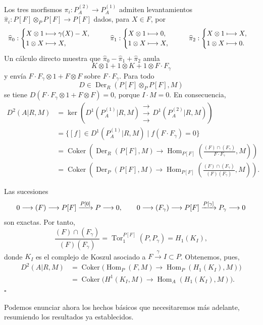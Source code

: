Los tres morfismos
$\pi_i:P_A^{(2)}\longrightarrow P_A^{(1)}$ admiten levantamientos
$\widehat\pi_i:P[F]\otimes_PP[F]\longrightarrow P[F]$ dados, para
$X\in F$, por
\[
\begin{array}{c@{\qquad}c@{\qquad}c}
\widehat\pi_0:
\begin{cases}
 X\otimes1\longmapsto\gamma(X)-X,\\
 1\otimes X\longmapsto X,
\end{cases}
&
\widehat\pi_1:
\begin{cases}
 X\otimes1\longmapsto0,\\
 1\otimes X\longmapsto X,
\end{cases}
&
\widehat\pi_2:
\begin{cases}
 X\otimes1\longmapsto X,\\
 1\otimes X\longmapsto0.
\end{cases}
\end{array}
\]
Un cálculo directo muestra que
$\widehat\pi_0-\widehat\pi_1+\widehat\pi_2$ anula
\[
 K\otimes1+1\otimes K+1\otimes F\cdot F_\gamma
\]
y envía
$F\cdot F_\gamma\otimes1+F\otimes F$ sobre
$F\cdot F_\gamma$. Para todo
\[
 D\in\operatorname{Der}_R(P[F]\otimes_PP[F],M)
\]
se tiene
$D(F\cdot F_\gamma\otimes1+F\otimes F)=0$, porque $I\cdot M=0$.
En consecuencia,
\begin{align*}
D^2(A|R,M)
 &=\ker\left(
   D^1(P_A^{(1)}|R,M)
   \mathrel{\substack{\longrightarrow\\[-.6ex]\longrightarrow\\[-.6ex]\longrightarrow}}
   D^1(P_A^{(2)}|R,M)\right)\\
 &=\{[f]\in D^1(P_A^{(1)}|R,M)
       \mid f(F\cdot F_\gamma)=0\}\\
 &=\operatorname{Coker}\left(
   \operatorname{Der}_R(P[F],M)\longrightarrow
   \operatorname{Hom}_{P[F]}
   \left(\frac{(F)\cap(F_\gamma)}{F\cdot F_\gamma},M\right)
   \right)\\
 &=\operatorname{Coker}\left(
   \operatorname{Der}_P(P[F],M)\longrightarrow
   \operatorname{Hom}_{P[F]}
   \left(\frac{(F)\cap(F_\gamma)}{(F)(F_\gamma)},M\right)
   \right).
\end{align*}

Las sucesiones
\[
 0\longrightarrow(F)\longrightarrow P[F]
 \sisi{\overset{P[0]}{\relbar\joinrel\relbar\joinrel\relbar}}{\xrightarrow{P[0]}}P\longrightarrow0,
 \qquad
 0\longrightarrow(F_\gamma)\longrightarrow P[F]
 \sisi{\overset{P[\gamma]}{\relbar\joinrel\relbar\joinrel\relbar}}{\xrightarrow{P[\gamma]}}P_\gamma\longrightarrow0
\]
son exactas. Por tanto,
\[
 \frac{(F)\cap(F_\gamma)}{(F)(F_\gamma)}
 =\operatorname{Tor}_1^{P[F]}(P,P_\gamma)
 =H_1(K_I),
\]
donde $K_I$ es el complejo de Koszul asociado a
$F\xrightarrow{\gamma}I\subset P$. Obtenemos, pues,
\begin{align*}
D^2(A|R,M)
 &=\operatorname{Coker}\bigl(
   \operatorname{Hom}_P(F,M)\longrightarrow
   \operatorname{Hom}_P(H_1(K_I),M)\bigr)\\
 &=\operatorname{Coker}\bigl(
   H^1(K_I,M)\longrightarrow
   \operatorname{Hom}_A(H_1(K_I),M)\bigr).
\end{align*}
\hfill$\square$

Podemos enunciar ahora los hechos básicos que necesitaremos más
adelante, resumiendo los resultados ya establecidos.
